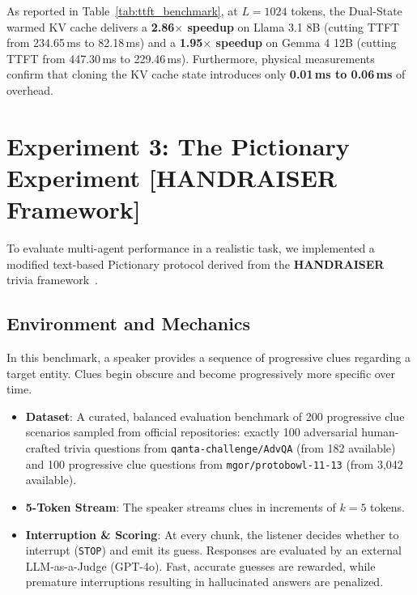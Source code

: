 \documentclass{article}
\begin{document}
As reported in Table~\ref{tab:ttft_benchmark}, at $L=1024$ tokens, the Dual-State warmed KV cache delivers a \textbf{2.86$\times$ speedup} on Llama 3.1 8B (cutting TTFT from 234.65\,ms to 82.18\,ms) and a \textbf{1.95$\times$ speedup} on Gemma 4 12B (cutting TTFT from 447.30\,ms to 229.46\,ms). Furthermore, physical measurements confirm that cloning the KV cache state introduces only \textbf{0.01\,ms to 0.06\,ms} of overhead.

\section{Experiment 3: The Pictionary Experiment [HANDRAISER Framework]}

To evaluate multi-agent performance in a realistic task, we implemented a modified text-based Pictionary protocol derived from the \textbf{HANDRAISER} trivia framework~\citep{rodriguez2021quizbowl}.

\subsection{Environment and Mechanics}
In this benchmark, a speaker provides a sequence of progressive clues regarding a target entity. Clues begin obscure and become progressively more specific over time.
\begin{itemize}
    \item \textbf{Dataset}: A curated, balanced evaluation benchmark of 200 progressive clue scenarios sampled from official repositories: exactly 100 adversarial human-crafted trivia questions from \texttt{qanta-challenge/AdvQA} (from 182 available) and 100 progressive clue questions from \texttt{mgor/protobowl-11-13} (from 3,042 available).
    \item \textbf{5-Token Stream}: The speaker streams clues in increments of $k=5$ tokens.
    \item \textbf{Interruption \& Scoring}: At every chunk, the listener decides whether to interrupt (\texttt{STOP}) and emit its guess. Responses are evaluated by an external LLM-as-a-Judge (GPT-4o). Fast, accurate guesses are rewarded, while premature interruptions resulting in hallucinated answers are penalized.
\end{itemize}
\end{document}
